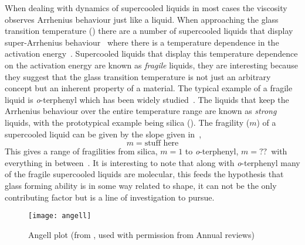 When dealing with dynamics of supercooled liquids in most cases the viscosity observes Arrhenius behaviour just like a liquid. When approaching the glass transition temperature (\si{\Tg}) there are a number of supercooled liquids that display super-Arrhenius behaviour~ where there is a temperature dependence in the activation energy~\cite{angell:91}. Supercooled liquids that display this temperature dependence on the activation energy are known as \emph{fragile} liquids, they are interesting because they suggest that the glass transition temperature is not just an arbitrary concept but an inherent property of a material. The typical example of a fragile liquid is \emph{o}-terphenyl which has been widely studied~\cite{greet:67}. The liquids that keep the Arrhenius behaviour over the entire temperature range are known as \emph{strong} liquids, with the prototypical example being silica (). The fragility ($m$) of a supercooled liquid can be given by the slope given in~,
\begin{equation}
    m = \text{stuff here}
\end{equation}
This gives a range of fragilities from silica, $m = 1$ to \emph{o}-terphenyl, $m = ??$~\tocheck with everything in between~\tabref{}. It is interesting to note that along with \emph{o}-terphenyl many of the fragile supercooled liquids are molecular, this feeds the hypothesis that glass forming ability is in some way related to shape, it can not be the only contributing factor but is a line of investigation to pursue.

\begin{figure}
    \texttt{[image: angell]}
    \caption{Angell plot (from \textcite{lubchenko:07}, used with permission from Annual reviews)}
    \label{fig:angell}
\end{figure}

